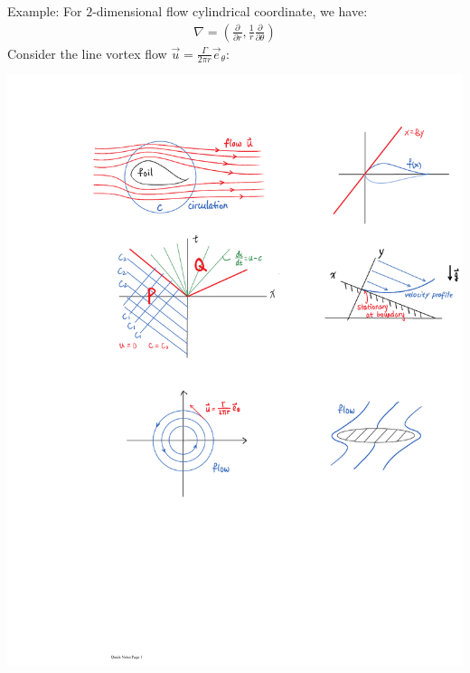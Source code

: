 \documentclass[11pt]{book}
\theoremstyle{break}
\theoremstyle{break}
\newcommand{\example}{\color{green}Example: \color{black}}
\begin{document}
\newpage
\example For $2$-dimensional flow cylindrical coordinate, we have:
\begin{align*}
\nabla  = \left( \frac{\partial}{\partial r} ,  \frac{1}{r}\frac{\partial}{\partial \theta}\right)
\end{align*}
Consider the line vortex flow $\vec{u} = \frac{\Gamma}{2\pi r}\vec{e}_{\theta}$:
\begin{center}
\includegraphics[scale=1.19]{vortex.pdf}
\end{center}
\end{document}
